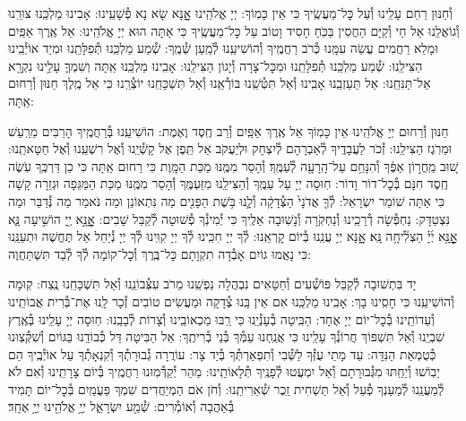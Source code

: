 \documentclass[twoside, openany, parskip=half, 11pt]{book}
\begin{document}
וְ֯חַנּוּן רַחֵם עָלֵֽינוּ וְ֯עַל כׇּל־מַעֲשֶֽׂיךָ כִּי אֵין כָּמֽוֹךָ: יְיָ אֱלֹהֵֽינוּ אׇׇׇנָּא שָׂא נָא פְ֯שָׁעֵֽינוּ: אָבִינוּ מַלְכֵּֽנוּ צוּרֵֽנוּ וְ֯גוֹאֲלֵֽנוּ אֵל חַי וְ֯קַיָּם הַחֲסִין בַּכֹּֽחַ חָסִיד וָטוֹב עַל כׇּל־מַעֲשֶֽׂיךָ כִּי אַתָּה הוּא יְיָ אֱלֹהֵֽינוּ: אֵל אֶֽרֶךְ אַפַּֽיִם וּמָלֵא רַחֲמִים עֲשֵׂה עִמָּֽנוּ כְּ֯רֹב רַחֲמֶֽיךָ וְ֯הוֹשִׁיעֵֽנוּ לְ֯מַֽעַן שְׁ֯מֶֽךָ: שְׁ֯מַע מַלְכֵּֽנוּ תְּ֯פִלָּתֵֽנוּ וּמִיַד אוֹיְ֯בֵֽינוּ הַצִּילֵֽנוּ: שְׁ֯מַע מַלְכֵּֽנוּ תְּ֯פִלָּתֵֽנוּ וּמִכׇּל־צָרָה וְ֯יָגוֹן הַצִּילֵֽנוּ: אָבִֽינוּ מַלְכֵּֽנוּ אַֽתָּה וְשִׁמְךָ֛ עָלֵ֥ינוּ נִקְרָ֖א אַל־תַּנִּחֵֽנוּ: אַל תַּעַזְבֵֽנוּ אָבִֽינוּ וְ֯אַל תִּטְּ֯שֵֽׁנוּ בּוֹרְ֯אֵֽנוּ וְ֯אַל תִּשְׁכָּחֵֽנוּ יוֹצְ֯רֵֽנוּ כִּי אֵל מֶֽלֶךְ חַנּוּן וְ֯רַחוּם אַֽתָּה:



חַנּוּן וְ֯רַחוּם יְיָ אֱלֹהֵֽינוּ אֵין כָּמֽוֹךָ אֵל אֶֽרֶךְ אַפַּֽיִם וְ֯רַב חֶֽסֶד וֶאֶמֶת: הוֹשִׁיעֵֽנוּ בְּ֯רַחֲמֶֽיךָ הָרַבִּים מֵרַֽעַשׁ וּמֵרֹֽגֶז הַצִּילֵֽנוּ: זְ֯כֹר לַעֲבָדֶֽיךָ לְ֯אַבְרָהָם לְ֯יִצְחָק וּלְיַעֲקֹב אַל תֵּֽפֶן אֶל קָשְׁ֯יֵֽנוּ וְ֯אֶל רִשְׁעֵֽנוּ וְ֯אֶל חַטָּאתֵֽנוּ:
שׁ֚וּב מֵֽחֲר֣וֹן אַפֶּ֔ךָ וְ֯הִנָּחֵ֥ם עַל־הָֽרָעָ֖ה לְ֯עַמֶּֽךָ׃ וְ֯הָסֵר מִמֶּֽנּוּ מַכַּת הַמָּֽוֶת כִּי רַחוּם אַֽתָּה כִּי כֵן דַּרְכֶּֽךָ עֹֽשֶׂה חֶֽסֶד חִנָּם בְּ֯כׇל־דוֹר וָדוֹר: חֽוּסָה יְיָ עַל עַמֶּֽךָ וְ֯הַצִּילֵֽנוּ מִזַּעְמֶּֽךָ וְ֯הָסֵר מִמֶּֽנּוּ מַכַּת הַמַּגֵּפָה וּגְזֵרָה קָשָׁה כִּי אַתָּה שׁוֹמֵר יִשְׂרָאֵל:
לְ֯ךָ֤ אֲדֹנָי֙ הַצְּ֯דָקָ֔ה וְ֯לָ֛נוּ בֹּ֥שֶׁת הַפָּנִ֖ים מַה נִּתְאוֹנֵן וּמַה נֹּאמַר מַה נְּ֯דַבֵּר וּמַה נִּצְטַדָּק: נַחְפְּ֯שָׂה דְ֯רָכֵֽינוּ וְ֯נַחְקֹֽרָה וְ֯נָשֽׁוּבָה אֵלֶֽיךָ כִּי יְ֯מִינְ֯ךָ פְ֯שׁוּטָה לְ֯קַבֵּל שָׁבִים:
אׇׇׇׇׇׇֽנָּ֣א יְ֖יָ הוֹשִׁ֣יעָה נָּ֑א אׇׇׇׇׇׇֽנָּ֥א יְ֜יָ֗ הַצְלִ֘יחָ֥ה נָּֽא׃ אׇׇׇנָּא יְיָ עֲנֵֽנוּ בְּ֯יוֹם קׇרְאֵֽנוּ: לְ֯ךָ יְיָ חִכִּֽינוּ לְ֯ךָ יְיָ קִוִּֽינוּ לְ֯ךָ יְיָ נְ֯יַחֵל אַל תֶּחֱשֶׁה וּתְעַנֵּֽנוּ כִּי נָאֲמוּ גוֹיִם אָבְ֯דָה תִקְוָתָם כׇּל־בֶּֽרֶךְ וְ֯כׇל־קוֹמָה לְ֯ךָ לְ֯בַד תִּשְׁתַּחֲוֶה:

יָד בִּתְשׁוּבָה לְ֯קַבֵּל פּוֹשְׁ֯עִים וְ֯חַטָּאִים נִבְהֲלָה נַפְשֵֽׁנוּ מֵרֹב עִצְּ֯בוֹנֵֽנוּ וְ֯אַל תִּשְׁכָּחֵֽנוּ נֶֽצַח: קֽוּמָה וְ֯הוֹשִׁיעֵֽנוּ כִּי חָסִֽינוּ בָךְ: אָבִֽינוּ מַלְכֵּֽנוּ אִם אֵין בָּֽנוּ צְ֯דָקָה וּמַעֲשִׂים טוֹבִים זְ֯כָר לָֽנוּ אֶת־בְּ֯רִית אֲבוֹתֵֽינוּ וְ֯עֵדוֹתֵֽינוּ בְּ֯כׇל־יוֹם יְיָ אֶחָד: הַבִּֽיטָה בְ֯עָנְ֯יֵֽנוּ כִּי רַֽבּוּ מַכְאוֹבֵֽינוּ וְ֯צָרוֹת לְ֯בָבֵֽנוּ: חֽוּסָה יְיָ עָלֵֽינוּ בְּ֯אֶֽרֶץ שִׁבְיֵֽנוּ וְ֯אַל תִּשְׁפּוֹךְ חֲרוֹנְ֯ךָ עָלֵֽינוּ כִּי אֲנַֽחְנוּ עַמְּ֯ךָ בְּ֯נֵי בְ֯רִיתֶֽךָ: אֵל הַבִּיטָה דַּל כְּ֯בוֹדֵֽנוּ בַּגּוֹיִם וְ֯שִׁקְּ֯צֽוּנוּ כְּ֯טֻמְאַת הַנִּדָּה: עַד מָתַי עֻזְּ֯ךָ לַשְּׁ֯בִי וְ֯תִפְאַרְתְּ֯ךָ בְּ֯יַד צָר: עוֹרֲרָה גְ֯בוּרָתְ֯ךָ וְ֯קִנְאָתְ֯ךָ עַל אוֹיְ֯בֶֽיךָ הֵם יֵבֽוֹשׁוּ וְ֯יֵחַֽתּוּ מִגְּ֯בוּרָתָם וְ֯אַל יִמְעֲטוּ לְ֯פָנֶֽיךָ תְּ֯לָאוֹתֵֽינוּ: מַהֵר יְ֯קַדְּ֯מֽוּנוּ רַחֲמֶֽיךָ בְּ֯יוֹם צָרָתֵֽינוּ וְ֯אִם לֹא לְ֯מַעֲנֵֽנוּ לְ֯מַעַנְךָ פְ֯עַל וְ֯אַל תַּשְׁחִית זֵֽכֶר שְׁ֯אֵרִיתֵֽנוּ: וְ֯חֹן אֹם הַמְיַחֲדִים שִׁמְךָ פַּעֲמַֽיִם בְּ֯כׇל־יוֹם תָּמִיד בְּ֯אַהֲבָה וְ֯אוֹמְ֯רִים:
שְׁ֯מַ֖ע יִשְׂרָאֵ֑ל יְיָ֥ אֱלֹהֵ֖ינוּ יְיָ֥ אֶחָֽד׃
\end{document}
